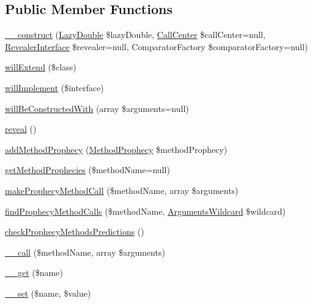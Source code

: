 \subsection*{Public Member Functions}
\begin{DoxyCompactItemize}
\item 
\mbox{\hyperlink{class_prophecy_1_1_prophecy_1_1_object_prophecy_a184f2c66392cf4a200f7c834f21524ff}{\+\_\+\+\_\+construct}} (\mbox{\hyperlink{class_prophecy_1_1_doubler_1_1_lazy_double}{Lazy\+Double}} \$lazy\+Double, \mbox{\hyperlink{class_prophecy_1_1_call_1_1_call_center}{Call\+Center}} \$call\+Center=null, \mbox{\hyperlink{interface_prophecy_1_1_prophecy_1_1_revealer_interface}{Revealer\+Interface}} \$revealer=null, Comparator\+Factory \$comparator\+Factory=null)
\item 
\mbox{\hyperlink{class_prophecy_1_1_prophecy_1_1_object_prophecy_a0603a7d97406dde0bbb20200c38a1ae9}{will\+Extend}} (\$class)
\item 
\mbox{\hyperlink{class_prophecy_1_1_prophecy_1_1_object_prophecy_af54922a80baf38e29dc5bc367a502ba4}{will\+Implement}} (\$interface)
\item 
\mbox{\hyperlink{class_prophecy_1_1_prophecy_1_1_object_prophecy_a1aef200c3aaf93059c543a52cd8f5341}{will\+Be\+Constructed\+With}} (array \$arguments=null)
\item 
\mbox{\hyperlink{class_prophecy_1_1_prophecy_1_1_object_prophecy_a95807c4aeec3dd185c70249cea8a0ea8}{reveal}} ()
\item 
\mbox{\hyperlink{class_prophecy_1_1_prophecy_1_1_object_prophecy_a90eadbad327825d713bb1a35b9338307}{add\+Method\+Prophecy}} (\mbox{\hyperlink{class_prophecy_1_1_prophecy_1_1_method_prophecy}{Method\+Prophecy}} \$method\+Prophecy)
\item 
\mbox{\hyperlink{class_prophecy_1_1_prophecy_1_1_object_prophecy_a6dd19322f13d6ed7f37c7ba1f9b29b71}{get\+Method\+Prophecies}} (\$method\+Name=null)
\item 
\mbox{\hyperlink{class_prophecy_1_1_prophecy_1_1_object_prophecy_ac9c1d5541cb94aaa43c19602f58a7725}{make\+Prophecy\+Method\+Call}} (\$method\+Name, array \$arguments)
\item 
\mbox{\hyperlink{class_prophecy_1_1_prophecy_1_1_object_prophecy_a1e3a9cc434b8068618fb0e7edbcb93b3}{find\+Prophecy\+Method\+Calls}} (\$method\+Name, \mbox{\hyperlink{class_prophecy_1_1_argument_1_1_arguments_wildcard}{Arguments\+Wildcard}} \$wildcard)
\item 
\mbox{\hyperlink{class_prophecy_1_1_prophecy_1_1_object_prophecy_a302b2878761b1e1f40bb64e8ea3d334b}{check\+Prophecy\+Methods\+Predictions}} ()
\item 
\mbox{\hyperlink{class_prophecy_1_1_prophecy_1_1_object_prophecy_a41bf0fe77f045b1d86356e4612cf4cce}{\+\_\+\+\_\+call}} (\$method\+Name, array \$arguments)
\item 
\mbox{\hyperlink{class_prophecy_1_1_prophecy_1_1_object_prophecy_abc8e9e31bb15c8a44c3210ec551407c8}{\+\_\+\+\_\+get}} (\$name)
\item 
\mbox{\hyperlink{class_prophecy_1_1_prophecy_1_1_object_prophecy_a83c2703c91959192f759992ad5640b67}{\+\_\+\+\_\+set}} (\$name, \$value)
\end{DoxyCompactItemize}


